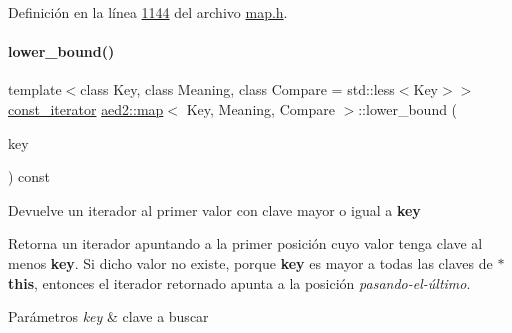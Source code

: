 Definición en la línea \hyperlink{map_8h_source_l01144}{1144} del archivo \hyperlink{map_8h_source}{map.\+h}.

\mbox{\label{classaed2_1_1map_a62075a47afdf89267c5462f88164af3d_a62075a47afdf89267c5462f88164af3d}} 
\paragraph{\texorpdfstring{lower\+\_\+bound()}{lower\_bound()}\hspace{0.1cm}{\footnotesize\ttfamily [1/2]}}
{\footnotesize\ttfamily template$<$class Key, class Meaning, class Compare = std\+::less$<$\+Key$>$$>$ \\
\hyperlink{classaed2_1_1map_1_1const__iterator}{const\+\_\+iterator} \hyperlink{classaed2_1_1map}{aed2\+::map}$<$ Key, Meaning, Compare $>$\+::lower\+\_\+bound (\begin{DoxyParamCaption}\item[{const Key \&}]{key }\end{DoxyParamCaption}) const\hspace{0.3cm}{\ttfamily [inline]}}



Devuelve un iterador al primer valor con clave mayor o igual a {\bfseries key} 

Retorna un iterador apuntando a la primer posición cuyo valor tenga clave al menos {\bfseries key}. Si dicho valor no existe, porque {\bfseries key} es mayor a todas las claves de {\bfseries $\ast$this}, entonces el iterador retornado apunta a la posición {\itshape pasando-\/el-\/último}.


\begin{DoxyParams}{Parámetros}
{\em key} & clave a buscar \\
\hline
\end{DoxyParams}

